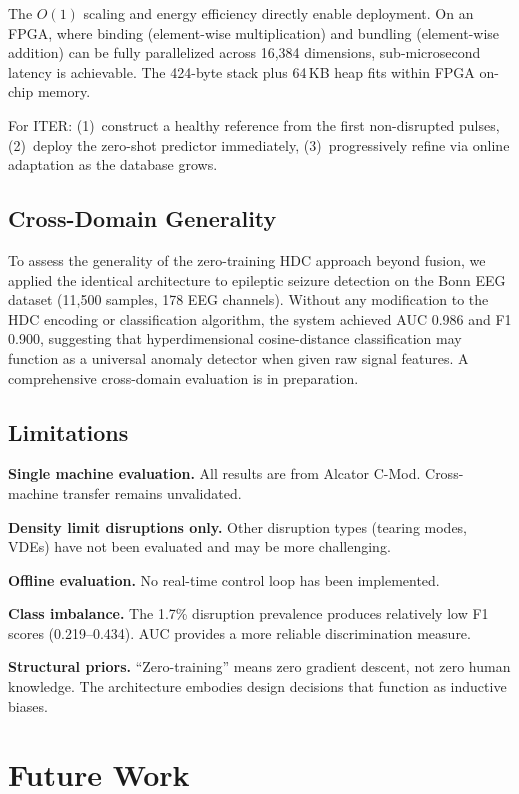 \documentclass[twocolumn,prl,aps,superscriptaddress,floatfix]{revtex4-2}
\begin{document}
The $O(1)$ scaling and energy efficiency directly enable deployment. On an FPGA, where binding (element-wise multiplication) and bundling (element-wise addition) can be fully parallelized across 16,384 dimensions, sub-microsecond latency is achievable. The 424-byte stack plus 64\,KB heap fits within FPGA on-chip memory.

For ITER: (1)~construct a healthy reference from the first non-disrupted pulses, (2)~deploy the zero-shot predictor immediately, (3)~progressively refine via online adaptation as the database grows.

\subsection{Cross-Domain Generality}

To assess the generality of the zero-training HDC approach beyond fusion, we applied the identical architecture to epileptic seizure detection on the Bonn EEG dataset (11,500 samples, 178 EEG channels). Without any modification to the HDC encoding or classification algorithm, the system achieved AUC 0.986 and F1 0.900, suggesting that hyperdimensional cosine-distance classification may function as a universal anomaly detector when given raw signal features. A comprehensive cross-domain evaluation is in preparation.

\subsection{Limitations}

\textbf{Single machine evaluation.} All results are from Alcator C-Mod. Cross-machine transfer remains unvalidated.

\textbf{Density limit disruptions only.} Other disruption types (tearing modes, VDEs) have not been evaluated and may be more challenging.

\textbf{Offline evaluation.} No real-time control loop has been implemented.

\textbf{Class imbalance.} The 1.7\% disruption prevalence produces relatively low F1 scores (0.219--0.434). AUC provides a more reliable discrimination measure.

\textbf{Structural priors.} ``Zero-training'' means zero gradient descent, not zero human knowledge. The architecture embodies design decisions that function as inductive biases.

\section{Future Work}
\label{sec:future}
\end{document}
